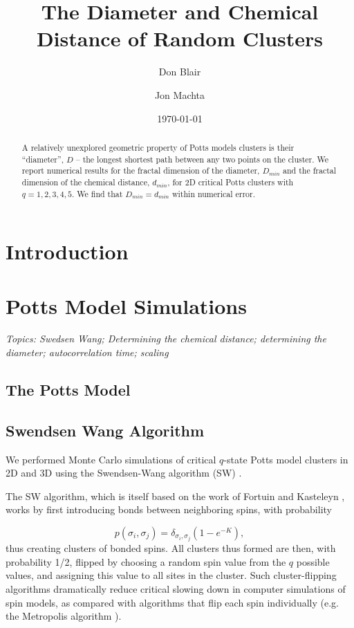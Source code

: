 \documentclass[pre,preprint]{revtex4}
\begin{document}
\title{The Diameter and Chemical Distance of Random Clusters}

\author{Don Blair}
\author{Jon Machta}

\date{\today}


\begin{abstract}
 A relatively unexplored geometric property of Potts models clusters is their ``diameter'', $D$ -- the longest shortest path between any two points on the cluster. We report numerical results for the fractal dimension of the diameter, $D_{min}$ and the fractal dimension of the chemical distance, $d_{min}$, for 2D critical Potts clusters with $q=1,2,3,4,5$. We find that $D_{min} = d_{min}$ within numerical error.
\end{abstract}

\maketitle 

\section{Introduction} 
\section{Potts Model Simulations}
{\it Topics: Swedsen Wang; Determining the chemical distance; determining the diameter; autocorrelation time; scaling}

\subsection{The Potts Model} 
\subsection{Swendsen Wang Algorithm} %

We performed Monte Carlo simulations of critical $q$-state Potts model clusters in 2D and 3D using the Swendsen-Wang algorithm (SW) \cite{SwWa86, NeBa99}.  

The SW algorithm, which is itself based on the work of Fortuin and Kasteleyn \cite{FoKa}, works by first introducing bonds between neighboring spins, with probability 

\begin{equation}
p(\sigma_i,\sigma_j) = \delta_{\sigma_i, \sigma_j} (1-e^{-K}),
\end{equation}  
thus creating clusters of bonded spins.   All clusters thus formed are then, with probability 1/2, flipped by choosing a random spin value from the $q$ possible values, and assigning this value to all sites in the cluster.  Such cluster-flipping algorithms dramatically reduce critical slowing down in computer simulations of spin models, as compared with algorithms that flip each spin individually \cite{NeBa99} (e.g. the Metropolis algorithm \cite{Met}). 
\end{document}
